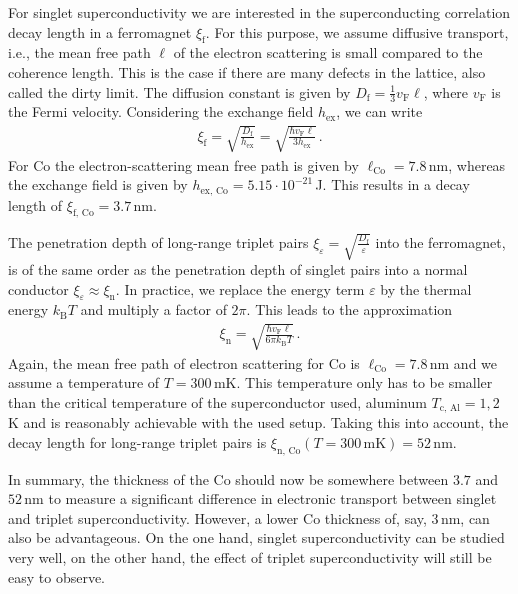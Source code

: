 For singlet superconductivity we are interested in the superconducting correlation decay length in a ferromagnet $\xi_\text{f}$. For this purpose, we assume diffusive transport, i.e., the mean free path $\ell$ of the electron scattering is small compared to the coherence length. This is the case if there are many defects in the lattice, also called the dirty limit. The diffusion constant is given by $D_\text{f}=\frac{1}{3}v_\text{F} \ell$, where $v_\text{F}$ is the Fermi velocity. Considering the exchange field $h_\text{ex}$, we can write
\begin{align}
    \xi_\text{f}=\sqrt{\frac{D_\text{f}}{h_\text{ex}}}=\sqrt{\frac{\hbar v_\text{F} \ell}{3h_\text{ex}}}\,.
\end{align}
For Co the electron-scattering mean free path is given by $\ell_\text{Co}=7.8\,$nm, whereas the exchange field is given by $h_\text{ex, Co}=5.15\cdot10^{-21}\,$J. This results in a decay length of $\xi_\text{f, Co}=3.7$\,nm. \cite{buzdin2006,gall2016,aharoni2000}

The penetration depth of long-range triplet pairs $\xi_\varepsilon=\sqrt{\frac{D_\text{f}}{\varepsilon}}$ into the ferromagnet, is of the same order as the penetration depth of singlet pairs into a normal conductor $\xi_\varepsilon\approx\xi_\text{n}$. In practice, we replace the energy term $\varepsilon$ by the thermal energy $k_\text{B}T$ and multiply a factor of $2\pi$. This leads to the approximation
\begin{align}
    \xi_\text{n}=\sqrt{\frac{\hbar v_\text{F}\ell}{6\pi k_\mathrm{B}T}}\,.
\end{align}
Again, the mean free path of electron scattering for Co is $\ell_\text{Co}=7.8\,$nm and we assume a temperature of $T=300\,$mK. This temperature only has to be smaller than the critical temperature of the superconductor used, aluminum $T_\text{c, Al}=1,2$\,K and is reasonably achievable with the used setup. Taking this into account, the decay length for long-range triplet pairs is $\xi_{\text{n, Co}}(T=300\,\text{mK})= 52$\,nm. \cite{Ujfalussy1996,gall2016,bergeret2001, buckel2013}

In summary, the thickness of the Co should now be somewhere between $3.7$ and $52\,$nm to measure a significant difference in electronic transport between singlet and triplet superconductivity. However, a lower Co thickness of, say, $3\,$nm, can also be advantageous. On the one hand, singlet superconductivity can be studied very well, on the other hand, the effect of triplet superconductivity will still be easy to observe.

